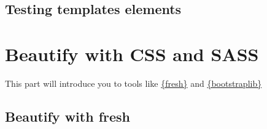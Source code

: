 \documentclass[]{book}
\begin{document}
\hypertarget{custom-templates-testing}{%
\chapter{Testing templates elements}\label{custom-templates-testing}}

\hypertarget{part-beautify-with-css-and-sass}{%
\part*{Beautify with CSS and SASS}\label{part-beautify-with-css-and-sass}}

This part will introduce you to tools like \href{https://dreamrs.github.io/fresh/index.html}{\{fresh\}} and \href{https://rstudio.github.io/bootstraplib/index.html}{\{bootstraplib\}}

\hypertarget{beautify-with-fresh}{%
\chapter{Beautify with fresh}\label{beautify-with-fresh}}


\end{document}
